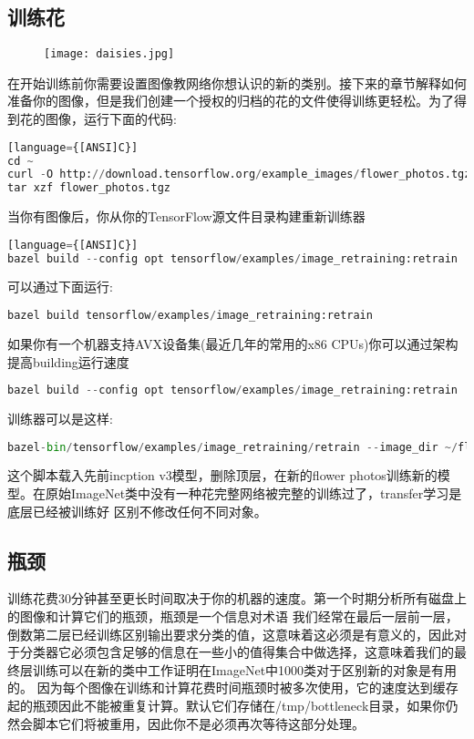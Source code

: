 \subsection{训练花}
\begin{center}
\begin{figure}

\centering
\texttt{[image: daisies.jpg]}
\end{figure}
\end{center}
在开始训练前你需要设置图像教网络你想认识的新的类别。接下来的章节解释如何准备你的图像，但是我们创建一个授权的归档的花的文件使得训练更轻松。为了得到花的图像，运行下面的代码:
\begin{lstlisting}[language=Python][language={[ANSI]C}]
cd ~
curl -O http://download.tensorflow.org/example_images/flower_photos.tgz
tar xzf flower_photos.tgz
\end{lstlisting}
当你有图像后，你从你的TensorFlow源文件目录构建重新训练器
\begin{lstlisting}[language=Python][language={[ANSI]C}]
bazel build --config opt tensorflow/examples/image_retraining:retrain
\end{lstlisting}
可以通过下面运行:
\begin{lstlisting}[language=Python]
bazel build tensorflow/examples/image_retraining:retrain
\end{lstlisting}
如果你有一个机器支持AVX设备集(最近几年的常用的x86 CPUs)你可以通过架构提高building运行速度
\begin{lstlisting}[language=Python]
bazel build --config opt tensorflow/examples/image_retraining:retrain
\end{lstlisting}
训练器可以是这样:
\begin{lstlisting}[language=Python]
bazel-bin/tensorflow/examples/image_retraining/retrain --image_dir ~/flower_photos
\end{lstlisting}
这个脚本载入先前incption v3模型，删除顶层，在新的flower photos训练新的模型。在原始ImageNet类中没有一种花完整网络被完整的训练过了，transfer学习是底层已经被训练好
区别不修改任何不同对象。
\subsection{瓶颈}
训练花费30分钟甚至更长时间取决于你的机器的速度。第一个时期分析所有磁盘上的图像和计算它们的瓶颈，瓶颈是一个信息对术语
我们经常在最后一层前一层，倒数第二层已经训练区别输出要求分类的值，这意味着这必须是有意义的，因此对于分类器它必须包含足够的信息在一些小的值得集合中做选择，这意味着我们的最终层训练可以在新的类中工作证明在ImageNet中1000类对于区别新的对象是有用的。
因为每个图像在训练和计算花费时间瓶颈时被多次使用，它的速度达到缓存起的瓶颈因此不能被重复计算。默认它们存储在/tmp/bottleneck目录，如果你仍然会脚本它们将被重用，因此你不是必须再次等待这部分处理。
